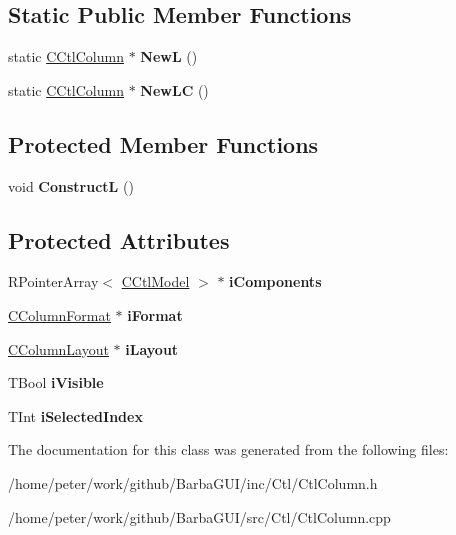 \subsection*{Static Public Member Functions}
\begin{DoxyCompactItemize}
\item 
\mbox{\label{classCCtlColumn_a77ec2692f144f3a75e61d91ba6ddd98b}} 
static \hyperlink{classCCtlColumn}{C\+Ctl\+Column} $\ast$ {\bfseries NewL} ()
\item 
\mbox{\label{classCCtlColumn_a4e7afa16a28869b5c3fbbf232f360bad}} 
static \hyperlink{classCCtlColumn}{C\+Ctl\+Column} $\ast$ {\bfseries New\+LC} ()
\end{DoxyCompactItemize}
\subsection*{Protected Member Functions}
\begin{DoxyCompactItemize}
\item 
\mbox{\label{classCCtlColumn_a20b96fb8d56714c1555b98d749e6fea9}} 
void {\bfseries ConstructL} ()
\end{DoxyCompactItemize}
\subsection*{Protected Attributes}
\begin{DoxyCompactItemize}
\item 
\mbox{\label{classCCtlColumn_a1ac8951c3a1c3e7c5a7ed602f999303d}} 
R\+Pointer\+Array$<$ \hyperlink{classCCtlModel}{C\+Ctl\+Model} $>$ $\ast$ {\bfseries i\+Components}
\item 
\mbox{\label{classCCtlColumn_ab81f9bd0162887c5b5623889b6721986}} 
\hyperlink{classCColumnFormat}{C\+Column\+Format} $\ast$ {\bfseries i\+Format}
\item 
\mbox{\label{classCCtlColumn_af37930eaaac60c35b08b0b49a38a4808}} 
\hyperlink{classCColumnLayout}{C\+Column\+Layout} $\ast$ {\bfseries i\+Layout}
\item 
\mbox{\label{classCCtlColumn_ab5642a466e4cc4ec869e5729bfadf406}} 
T\+Bool {\bfseries i\+Visible}
\item 
\mbox{\label{classCCtlColumn_a0f5586dda0bc3cc1b688c72c8cd5ed34}} 
T\+Int {\bfseries i\+Selected\+Index}
\end{DoxyCompactItemize}


The documentation for this class was generated from the following files\+:\begin{DoxyCompactItemize}
\item 
/home/peter/work/github/\+Barba\+G\+U\+I/inc/\+Ctl/Ctl\+Column.\+h\item 
/home/peter/work/github/\+Barba\+G\+U\+I/src/\+Ctl/Ctl\+Column.\+cpp\end{DoxyCompactItemize}
